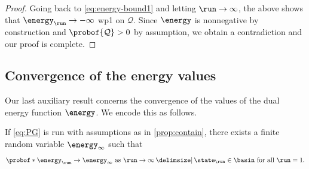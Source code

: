 \begin{proof}
Going back to \eqref{eq:energy-bound1} and letting $\run\to\infty$, the above shows that $\curr[\energy] \to -\infty$ \acl{wp1} on $\mathcal{Q}$.
Since $\energy$ is nonnegative by construction and $\probof{\mathcal{Q}} > 0$ by assumption, we obtain a contradiction and our proof is complete.
\end{proof}



\subsection{Convergence of the energy values}

Our last auxiliary result concerns the convergence of the values of the dual energy function $\energy$.
We encode this as follows.

\begin{proposition}
\label{prop:energy}
If \eqref{eq:PG} is run with assumptions as in \cref{prop:contain}, there exists a finite random variable $\energy_{\infty}$ such that
\begin{equation}
\label{eq:energy-conv}
\probof*{\text{$\curr[\energy] \to \energy_{\infty}$ as $\run\to\infty$} \given \text{$\curr\in\basin$ for all $\run$}}
	= 1.
\end{equation}
\end{proposition}


